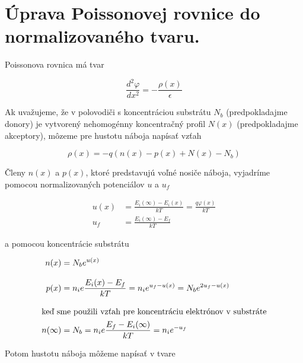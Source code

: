 
\chapter{Úprava Poissonovej rovnice do normalizovaného tvaru.}\label{app:AppendixB}

Poissonova rovnica má tvar

\begin{equation}\label{eq:B.1}
  \frac{d^{2}\varphi}{dx^2} = - \frac{\rho(x)}{\epsilon}
\end{equation}

Ak uvažujeme, že v polovodiči s koncentráciou substrátu $N_b$
(predpokladajme donory) je vytvorený nehomogénny koncentračný profil
$N(x)$ (predpokladajme akceptory), môzeme pre hustotu náboja napísať
vzťah

\begin{equation}\label{eq:B.2}
  \rho(x) = - q (n(x) - p(x) + N(x) -N_b)
\end{equation}

Členy $n(x)$ a $p(x)$, ktoré predstavujú voľné nosiče náboja,
vyjadríme pomocou normalizovaných potenciálov $u$ a $u_f$

\begin{subequations}\label{eq:B.3}
  \begin{align}
    u(x) &= \frac{E_i(\infty) - E_i(x)}{kT} = \frac{q\varphi(x)}{kT} \label{eq:B.3a}\\[0.3cm]
    u_f &= \frac{E_i(\infty) - E_f}{kT} \label{eq:B.3b}
  \end{align}
\end{subequations}

a pomocou koncentrácie substrátu

\begin{subequations}\label{eq:B.4}
  \begin{align}
    n(x) &= N_b {e}^{u(x)}\label{eq:B.4a}\\[0.3cm]
    p(x) &= n_i {e}\frac{E_i(x) - E_f}{kT} = n_i {e}^{u_f-u(x)} = N_b {e}^{2u_f-u(x)}\label{eq:B.4b}\\[0.3cm]
    \intertext{keď sme použili vzťah pre koncentráciu elektrónov v substráte}
    n(\infty) &= N_b = n_i {e}\frac{E_f-E_i(\infty)}{kT} = n_i {e}^{-u_f}\label{eq:B.4c}
\end{align}
\end{subequations}

Potom hustotu náboja môžeme napísať v tvare

